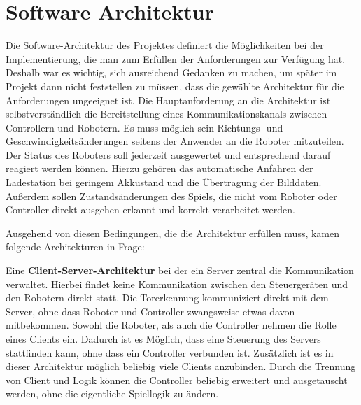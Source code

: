 \section{Software Architektur}
\label{sec:software-architektur}

Die Software-Architektur des Projektes definiert die Möglichkeiten bei der Implementierung, die man zum Erfüllen der Anforderungen zur Verfügung hat. Deshalb war es wichtig, sich ausreichend Gedanken zu machen, um später im Projekt dann nicht feststellen zu müssen, dass die gewählte Architektur für die Anforderungen ungeeignet ist. Die Hauptanforderung an die Architektur ist selbstverständlich die Bereitstellung eines Kommunikationskanals zwischen Controllern und Robotern. Es muss möglich sein Richtungs- und Geschwindigkeitsänderungen seitens der Anwender an die Roboter mitzuteilen. Der Status des Roboters soll jederzeit ausgewertet und entsprechend darauf reagiert werden können. Hierzu gehören das automatische Anfahren der Ladestation bei geringem Akkustand und die Übertragung der Bilddaten. Außerdem sollen Zustandsänderungen des Spiels, die nicht vom Roboter oder Controller direkt ausgehen erkannt und korrekt verarbeitet werden. 

Ausgehend von diesen Bedingungen, die die Architektur erfüllen muss, kamen folgende Architekturen in Frage:

Eine \textbf{Client-Server-Architektur} bei der ein Server zentral die Kommunikation verwaltet. Hierbei findet keine Kommunikation zwischen den Steuergeräten und den Robotern direkt statt. Die Torerkennung kommuniziert direkt mit dem Server, ohne dass Roboter und Controller zwangsweise etwas davon mitbekommen. Sowohl die Roboter, als auch die Controller nehmen die Rolle eines Clients ein. Dadurch ist es Möglich, dass eine Steuerung des Servers stattfinden kann, ohne dass ein Controller verbunden ist. Zusätzlich ist es in dieser Architektur möglich beliebig viele Clients anzubinden. Durch die Trennung von Client und Logik können die Controller beliebig erweitert und ausgetauscht werden, ohne die eigentliche Spiellogik zu ändern.

